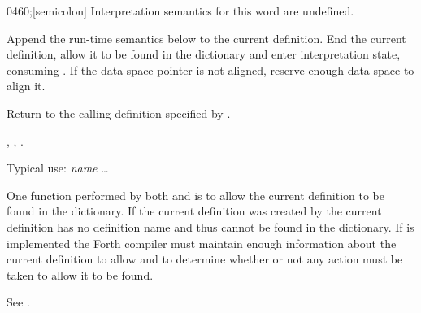 \begin{worddef}{0460}{;}[semicolon]
\interpret
	Interpretation semantics for this word are undefined.

\compile

	Append the run-time semantics below to the current definition. End
	the current definition, allow it to be found in the dictionary and
	enter interpretation state, consuming . If the
	data-space pointer is not aligned, reserve enough data space to
	align it.

\runtime
	\stack{}{}

	Return to the calling definition specified by .

\see {},
	,
	.

	\begin{rationale} %
		Typical use:
			\word{:} \emph{name} {\ldots} \word{;}

		One function performed by both \word{;} and 
		is to allow the current definition to be found in the
		dictionary. If the current definition was created by
		 the current definition has no definition name
		and thus cannot be found in the dictionary. If 
		is implemented the Forth compiler must maintain enough
		information about the current definition to allow \word{;} and
		 to determine whether or not any action must
		be taken to allow it to be found.
	\end{rationale}

	\begin{testing} %
		See .
	\end{testing}
\end{worddef}


